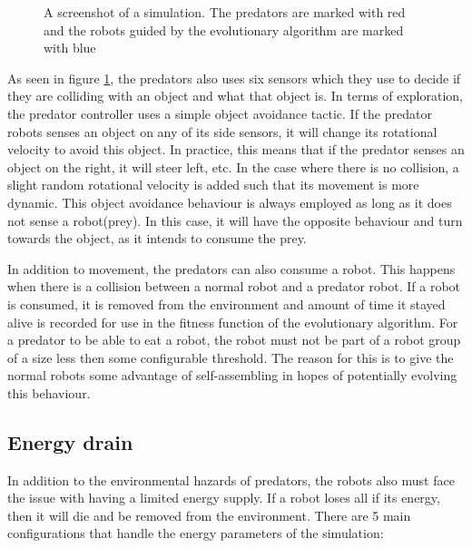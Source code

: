 \begin{figure}[H]
	\centering
	\caption{A screenshot of a simulation. The predators are marked with red and the robots guided by the evolutionary algorithm are marked with blue}
	\label{fig:predator_screendump}
\end{figure}

As seen in figure \ref{fig:predator_screendump}, the predators also uses six sensors which they use to decide if they are colliding with an object and what that object is.	
In terms of exploration, the predator controller uses a simple object avoidance tactic.
If the predator robots senses an object on any of its side sensors, it will change its rotational velocity to avoid this object.
In practice, this means that if the predator senses an object on the right, it will steer left, etc.
In the case where there is no collision, a slight random rotational velocity is added such that its movement is more dynamic.
This object avoidance behaviour is always employed as long as it does not sense a robot(prey).
In this case, it will have the opposite behaviour and turn towards the object, as it intends to consume the prey.

In addition to movement, the predators can also consume a robot. 
This happens when there is a collision between a normal robot and a predator robot.
If a robot is consumed, it is removed from the environment and amount of time it stayed alive is recorded for use in the fitness function of the evolutionary algorithm. 
For a predator to be able to eat a robot, the robot must not be part of a robot group of a size less then some configurable threshold.
The reason for this is to give the normal robots some advantage of self-assembling in hopes of potentially evolving this behaviour.  

\subsection{Energy drain}
In addition to the environmental hazards of predators, the robots also must face the issue with having a limited energy supply.
If a robot loses all if its energy, then it will die and be removed from the environment.
There are 5 main configurations that handle the energy parameters of the simulation:

